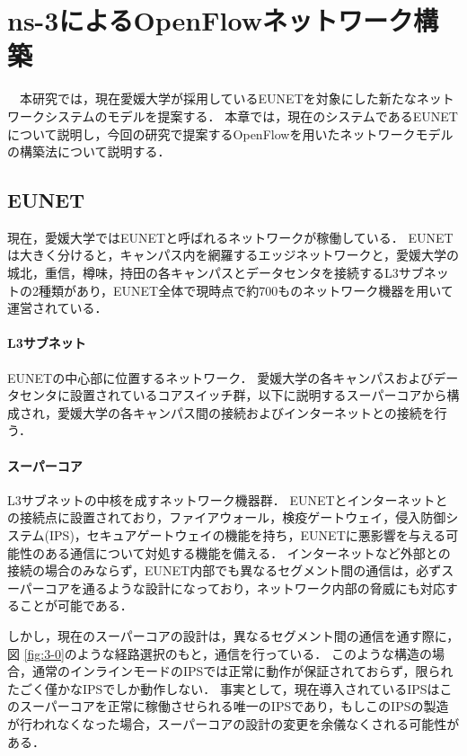 \chapter{ns-3によるOpenFlowネットワーク構築}

　本研究では，現在愛媛大学が採用しているEUNETを対象にした新たなネットワークシステムのモデルを提案する．
本章では，現在のシステムであるEUNETについて説明し，今回の研究で提案するOpenFlowを用いたネットワークモデルの構築法について説明する．

\section{EUNET}

現在，愛媛大学ではEUNETと呼ばれるネットワークが稼働している．
EUNETは大きく分けると，キャンパス内を網羅するエッジネットワークと，愛媛大学の城北，重信，樽味，持田の各キャンパスとデータセンタを接続するL3サブネットの2種類があり，EUNET全体で現時点で約700ものネットワーク機器を用いて運営されている．

\subsubsection{L3サブネット}

EUNETの中心部に位置するネットワーク．
愛媛大学の各キャンパスおよびデータセンタに設置されているコアスイッチ群，以下に説明するスーパーコアから構成され，愛媛大学の各キャンパス間の接続およびインターネットとの接続を行う．

\subsubsection{スーパーコア}

L3サブネットの中核を成すネットワーク機器群．
EUNETとインターネットとの接続点に設置されており，ファイアウォール，検疫ゲートウェイ，侵入防御システム(IPS)，セキュアゲートウェイの機能を持ち，EUNETに悪影響を与える可能性のある通信について対処する機能を備える．
インターネットなど外部との接続の場合のみならず，EUNET内部でも異なるセグメント間の通信は，必ずスーパーコアを通るような設計になっており，ネットワーク内部の脅威にも対応することが可能である．

しかし，現在のスーパーコアの設計は，異なるセグメント間の通信を通す際に，図 \ref{fig:3-0}のような経路選択のもと，通信を行っている．
このような構造の場合，通常のインラインモードのIPSでは正常に動作が保証されておらず，限られたごく僅かなIPSでしか動作しない．
事実として，現在導入されているIPSはこのスーパーコアを正常に稼働させられる唯一のIPSであり，もしこのIPSの製造が行われなくなった場合，スーパーコアの設計の変更を余儀なくされる可能性がある．

